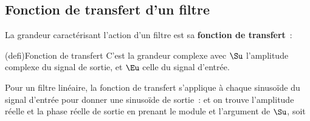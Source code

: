 \documentclass[../../main/main.tex]{subfiles}
\begin{document}
\subsection{Fonction de transfert d'un filtre}

La grandeur caractérisant l'action d'un filtre est sa \textbf{fonction de
	transfert}~:
\begin{tcb*}(defi){Fonction de transfert}
	C'est la grandeur complexe
	\psw{
		\[
			\Hu = \frac{\Su}{\Eu}
			\Lra
			\Su = \Hu\Eu
		\]
	}
	avec $\Su$ l'amplitude complexe du signal de sortie, et $\Eu$ celle du signal
	d'entrée.
\end{tcb*}
Pour un filtre linéaire, la fonction de transfert s'applique à chaque sinusoïde
du signal d'entrée pour donner une sinusoïde de sortie~:
\psw{
	\[
		e_n(t) = E_n \sin(n\w_e t + \f_n)
		\Ra
		s_n(t) = S_n \sin(n\w_e t + \psi_n)
	\]
}
et on trouve l'amplitude réelle et la phase réelle de sortie en prenant le
module et l'argument de $\Su$, soit
\psw{
	\[
		S_n = \abs{\xul{S_n}} = \abs{\xul{H}\xul{E_n}}
		\qet
		\psi_n = \arg*{{\xul{S_n}}} = \arg*{{\xul{H}\xul{E_n}}}
	\]
}
\end{document}
